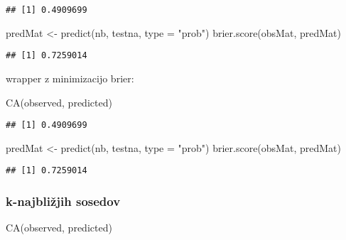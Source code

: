\documentclass[
]{article}
\newenvironment{Shaded}{\begin{snugshade}}{\end{snugshade}}
\newcommand{\AttributeTok}[1]{\textcolor[rgb]{0.77,0.63,0.00}{#1}}
\newcommand{\FunctionTok}[1]{\textcolor[rgb]{0.00,0.00,0.00}{#1}}
\newcommand{\NormalTok}[1]{#1}
\newcommand{\OtherTok}[1]{\textcolor[rgb]{0.56,0.35,0.01}{#1}}
\newcommand{\StringTok}[1]{\textcolor[rgb]{0.31,0.60,0.02}{#1}}
\begin{document}
\begin{verbatim}
## [1] 0.4909699
\end{verbatim}

\begin{Shaded}
\begin{Highlighting}[]
\NormalTok{predMat }\OtherTok{\textless{}{-}} \FunctionTok{predict}\NormalTok{(nb, testna, }\AttributeTok{type =} \StringTok{"prob"}\NormalTok{)}
\FunctionTok{brier.score}\NormalTok{(obsMat, predMat)}
\end{Highlighting}
\end{Shaded}

\begin{verbatim}
## [1] 0.7259014
\end{verbatim}

wrapper z minimizacijo brier:

\begin{Shaded}
\begin{Highlighting}[]
\FunctionTok{CA}\NormalTok{(observed, predicted)}
\end{Highlighting}
\end{Shaded}

\begin{verbatim}
## [1] 0.4909699
\end{verbatim}

\begin{Shaded}
\begin{Highlighting}[]
\NormalTok{predMat }\OtherTok{\textless{}{-}} \FunctionTok{predict}\NormalTok{(nb, testna, }\AttributeTok{type =} \StringTok{"prob"}\NormalTok{)}
\FunctionTok{brier.score}\NormalTok{(obsMat, predMat)}
\end{Highlighting}
\end{Shaded}

\begin{verbatim}
## [1] 0.7259014
\end{verbatim}

\hypertarget{k-najbliux17ejih-sosedov}{%
\subsubsection{k-najbližjih sosedov}\label{k-najbliux17ejih-sosedov}}

\begin{Shaded}
\begin{Highlighting}[]
\FunctionTok{CA}\NormalTok{(observed, predicted)}
\end{Highlighting}
\end{Shaded}
\end{document}

